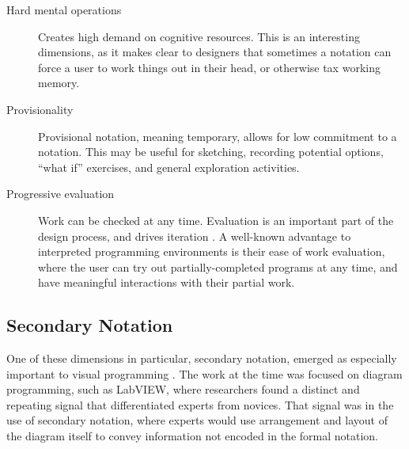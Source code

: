 \begin{description}
\item [Hard mental operations] Creates high demand on cognitive resources. This is an interesting dimensions, as it makes clear to designers that sometimes a notation can force a user to work things out in their head, or otherwise tax working memory.
\item [Provisionality] Provisional notation, meaning temporary, allows for low commitment to a notation. This may be useful for sketching, recording potential options, ``what if'' exercises, and general exploration activities.
\item [Progressive evaluation] Work can be checked at any time. Evaluation is an important part of the design process, and drives iteration \citep{atman-2003}. A well-known advantage to interpreted programming environments is their ease of work evaluation, where the user can try out partially-completed programs at any time, and have meaningful interactions with their partial work.
\end{description}

\subsection{Secondary Notation}
One of these dimensions in particular, secondary notation, emerged as especially important to visual programming \citep{petre-2006}. The work at the time was focused on diagram programming, such as LabVIEW, where researchers found a distinct and repeating signal that differentiated experts from novices. That signal was in the use of secondary notation, where experts would use arrangement and layout of the diagram itself to convey information not encoded in the formal notation. 

